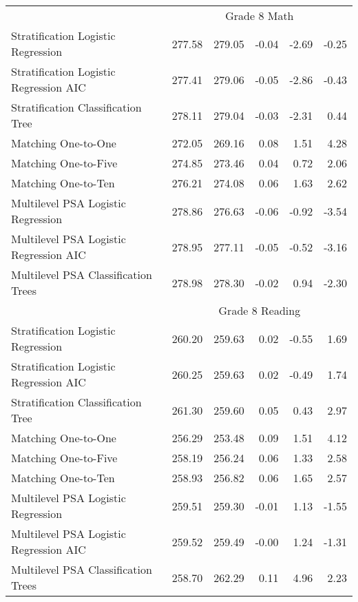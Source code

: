 \begin{table}[ht]
\begin{tabular}{lrrrrr}
    \hline & \multicolumn{5}{c}{Grade 8 Math} \\ \cline{2-6} Stratification Logistic Regression & 277.58 & 279.05 & -0.04 & -2.69 & -0.25 \\ 
  Stratification Logistic Regression AIC & 277.41 & 279.06 & -0.05 & -2.86 & -0.43 \\ 
  Stratification Classification Tree & 278.11 & 279.04 & -0.03 & -2.31 & 0.44 \\ 
  Matching One-to-One & 272.05 & 269.16 & 0.08 & 1.51 & 4.28 \\ 
  Matching One-to-Five & 274.85 & 273.46 & 0.04 & 0.72 & 2.06 \\ 
  Matching One-to-Ten & 276.21 & 274.08 & 0.06 & 1.63 & 2.62 \\ 
  Multilevel PSA Logistic Regression & 278.86 & 276.63 & -0.06 & -0.92 & -3.54 \\ 
  Multilevel PSA Logistic Regression AIC & 278.95 & 277.11 & -0.05 & -0.52 & -3.16 \\ 
  Multilevel PSA Classification Trees & 278.98 & 278.30 & -0.02 & 0.94 & -2.30 \\ 
    \hline & \multicolumn{5}{c}{Grade 8 Reading} \\ \cline{2-6} Stratification Logistic Regression & 260.20 & 259.63 & 0.02 & -0.55 & 1.69 \\ 
  Stratification Logistic Regression AIC & 260.25 & 259.63 & 0.02 & -0.49 & 1.74 \\ 
  Stratification Classification Tree & 261.30 & 259.60 & 0.05 & 0.43 & 2.97 \\ 
  Matching One-to-One & 256.29 & 253.48 & 0.09 & 1.51 & 4.12 \\ 
  Matching One-to-Five & 258.19 & 256.24 & 0.06 & 1.33 & 2.58 \\ 
  Matching One-to-Ten & 258.93 & 256.82 & 0.06 & 1.65 & 2.57 \\ 
  Multilevel PSA Logistic Regression & 259.51 & 259.30 & -0.01 & 1.13 & -1.55 \\ 
  Multilevel PSA Logistic Regression AIC & 259.52 & 259.49 & -0.00 & 1.24 & -1.31 \\ 
  Multilevel PSA Classification Trees & 258.70 & 262.29 & 0.11 & 4.96 & 2.23 \\ 
   \hline
\end{tabular}
\label{tab:overall}
\end{table}
